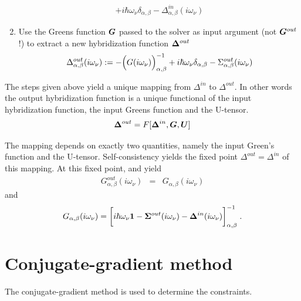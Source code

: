 \documentclass[11pt,a4paper]{report}
\begin{document}
\begin{enumerate}
\begin{eqnarray}
+i\hbar\omega_\nu\delta_{\alpha,\beta}
-\Delta^{in}_{\alpha,\beta}(i\omega_\nu)
\label{eq:sigmaout}
\end{eqnarray}
%
\item Use the Greens function $\bm{G}$ passed
  to the solver as input argument (not
  $\bm{G}^{out}$!)  to extract a new
  hybridization function $\bm{\Delta}^{out}$
\begin{eqnarray}
\Delta^{out}_{\alpha,\beta}(i\omega_\nu)
:=-\Bigl(G(i\omega_\nu)\Bigr)^{-1}_{\alpha,\beta}
+i\hbar\omega_\nu\delta_{\alpha,\beta}-\Sigma^{out}_{\alpha,\beta}(i\omega_\nu)
\label{eq:deltaout}
\end{eqnarray}
\end{enumerate}


The steps given above yield a unique mapping from $\Delta^{in}$ to
$\Delta^{out}$. In other words the output hybridization function is a
unique functional of the input hybridization function, the input
Greens function and the U-tensor.
\begin{eqnarray}
\bm{\Delta}^{out}=F[\bm{\Delta}^{in},\bm{G},\bm{U}]
\end{eqnarray}


The mapping depends on exactly two quantities, namely
the input Green's function and the U-tensor. Self-consistency yields the 
fixed point $\Delta^{out}=\Delta^{in}$ of this mapping.
At this fixed point,  and  yield
\begin{eqnarray}
G^{out}_{\alpha,\beta}(i\omega_\nu)&=&G_{\alpha,\beta}(i\omega_\nu)
\end{eqnarray}
and 
\begin{eqnarray}
G_{\alpha,\beta}(i\omega_\nu)
=\biggl[
i\hbar\omega_\nu\bm{1}
-\bm{\Sigma}^{out}(i\omega_\nu)
-\bm{\Delta}^{in}(i\omega_\nu)
\biggr]^{-1}_{\alpha,\beta}
\;.
\end{eqnarray}

\chapter{Conjugate-gradient method}
The conjugate-gradient method is used to determine the
constraints. 


\end{document}
